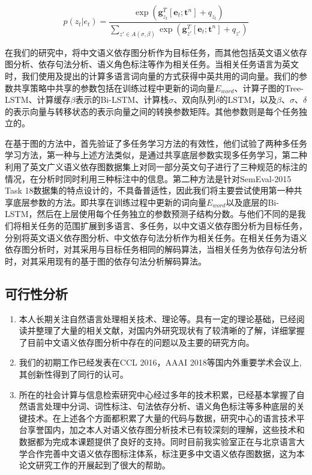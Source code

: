 \begin{equation}
p(z_t|e_t)=\frac{\exp(\mathbf{g}^T_{z_t}[\mathbf{e}_t;\mathbf{t}^n] + q_{z_t})}{\sum_{z'\in A(\sigma, \beta)}\exp (\mathbf{g}^T_{z'}[\mathbf{e}_t;\mathbf{t}^n]+q_{z'})}
\end{equation}

在我们的研究中，将中文语义依存图分析作为目标任务，而其他包括英文语义依存图分析、依存句法分析、语义角色标注等作为相关任务。当相关任务语言为英文时，我们使用及提出的计算多语言词向量的方式获得中英共用的词向量。我们的参数共享策略中共享的参数包括在训练过程中更新的词向量$E_{word}$、计算子图的Tree-LSTM、计算缓存$\beta$表示的Bi-LSTM、计算栈$\sigma$、双向队列$\delta$的LSTM，以及$\beta$、$\sigma$、$\delta$的表示向量与转移状态的表示向量之间的转换参数矩阵。其他参数则是每个任务独立的。

在基于图的方法中，首先验证了多任务学习方法的有效性，他们试验了两种多任务学习方法，第一种与上述方法类似，是通过共享底层参数实现多任务学习，第二种利用了英文广义语义依存图数据集上对同一部分英文句子进行了三种规范的标注的情况，在分析时同时利用三种标注中的信息。第二种方法是针对SemEval-2015 Task 18数据集的特点设计的，不具备普适性，因此我们将主要尝试使用第一种共享底层参数的方法。即共享在训练过程中更新的词向量$E_{word}$以及底层的Bi-LSTM，然后在上层使用每个任务独立的参数预测子结构分数。与他们不同的是我们将相关任务的范围扩展到多语言、多任务，以中文语义依存图分析为目标任务，分别将英文语义依存图分析、中文依存句法分析作为相关任务。在相关任务为语义依存图分析时，对其采用与目标任务相同的解码算法，当相关任务为依存句法分析时，对其采用现有的基于图的依存句法分析解码算法。

\subsection{可行性分析}
\begin{enumerate}
	\item 本人长期关注自然语言处理相关技术、理论等。具有一定的理论基础，已经阅读并整理了大量的相关文献，对国内外研究现状有了较清晰的了解，详细掌握了目前中文语义依存图分析中存在的问题以及主要的研究方向。
	
	\item 我们的初期工作已经发表在CCL 2016，AAAI 2018等国内外重要学术会议上,其创新性得到了同行的认可。
	
	\item 所在的社会计算与信息检索研究中心经过多年的技术积累，已经基本掌握了自然语言处理中分词、词性标注、句法依存分析、语义角色标注等多种底层的关键技术。在上述各个方面都积累了大量的代码与数据，研究中心的语言技术平台享誉国内，加之本人对语义依存图分析技术已有较深刻的理解，这些技术和数据都为完成本课题提供了良好的支持。同时目前我实验室正在与北京语言大学合作完善中文语义依存图标注体系，标注更多中文语义依存图数据，这为本论文研究工作的开展起到了很大的帮助。
	
	
\end{enumerate}
